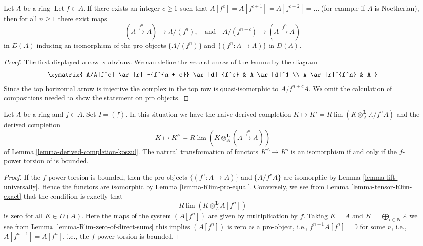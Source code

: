 \begin{lemma}
\label{lemma-lift-universally}
Let $A$ be a ring. Let $f \in A$. If there exists an integer $c \geq 1$
such that $A[f^c] = A[f^{c + 1}] = A[f^{c + 2}] = \ldots$ (for example
if $A$ is Noetherian), then for all $n \geq 1$ there exist maps
$$
(A \xrightarrow{f^n} A) \longrightarrow A/(f^n),
\quad\text{and}\quad
A/(f^{n + c}) \longrightarrow (A \xrightarrow{f^n} A)
$$
in $D(A)$ inducing an isomorphism of the pro-objects $\{A/(f^n)\}$ and
$\{(f^n : A \to A)\}$ in $D(A)$.
\end{lemma}

\begin{proof}
The first displayed arrow is obvious. We can define the second arrow of
the lemma by the diagram
$$
\xymatrix{
A/A[f^c] \ar[r]_-{f^{n + c}} \ar[d]_{f^c} & A \ar[d]^1 \\
A \ar[r]^{f^n} & A
}
$$
Since the top horizontal arrow is injective the complex
in the top row is quasi-isomorphic to $A/f^{n + c}A$.
We omit the calculation of compositions needed to show
the statement on pro objects.
\end{proof}

\begin{lemma}
\label{lemma-when-does-it-work}
Let $A$ be a ring and $f \in A$. Set $I = (f)$. In this situation
we have the naive derived completion
$K \mapsto K' = R\lim (K \otimes_A^\mathbf{L} A/f^nA)$ and the
derived completion
$$
K \mapsto K^\wedge = R\lim (K \otimes_A^\mathbf{L} (A \xrightarrow{f^n} A))
$$
of Lemma \ref{lemma-derived-completion-koszul}.
The natural transformation of functors $K^\wedge \to K'$
is an isomorphism if and only if the $f$-power torsion of is bounded.
\end{lemma}

\begin{proof}
If the $f$-power torsion is bounded, then the pro-objects
$\{(f^n : A \to A)\}$ and $\{A/f^nA\}$ are isomorphic by
Lemma \ref{lemma-lift-universally}.
Hence the functors are isomorphic by Lemma \ref{lemma-Rlim-pro-equal}.
Conversely, we see from Lemma \ref{lemma-tensor-Rlim-exact}
that the condition is exactly that
$$
R\lim (K \otimes_A^\mathbf{L} A[f^n])
$$
is zero for all $K \in D(A)$. Here the maps of the system $(A[f^n])$
are given by multiplication by $f$. Taking $K = A$ and
$K = \bigoplus_{i \in \mathbf{N}} A$ we see from
Lemma \ref{lemma-Rlim-zero-of-direct-sums}
this implies $(A[f^n])$ is zero as a pro-object, i.e.,
$f^{n - 1}A[f^n] = 0$ for some $n$, i.e., $A[f^{n - 1}] = A[f^n]$, i.e.,
the $f$-power torsion is bounded.
\end{proof}

